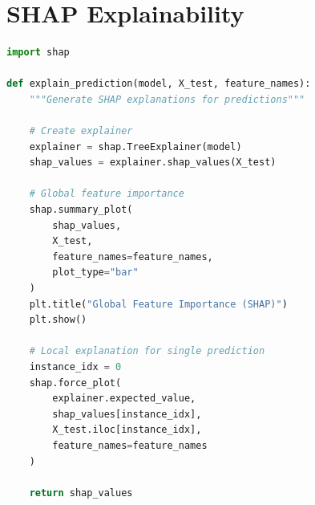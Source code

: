 \section{SHAP Explainability}

\begin{lstlisting}[language=Python, caption={SHAP Model Explanation}]
import shap

def explain_prediction(model, X_test, feature_names):
    """Generate SHAP explanations for predictions"""
    
    # Create explainer
    explainer = shap.TreeExplainer(model)
    shap_values = explainer.shap_values(X_test)
    
    # Global feature importance
    shap.summary_plot(
        shap_values, 
        X_test, 
        feature_names=feature_names,
        plot_type="bar"
    )
    plt.title("Global Feature Importance (SHAP)")
    plt.show()
    
    # Local explanation for single prediction
    instance_idx = 0
    shap.force_plot(
        explainer.expected_value,
        shap_values[instance_idx],
        X_test.iloc[instance_idx],
        feature_names=feature_names
    )
    
    return shap_values
\end{lstlisting}

